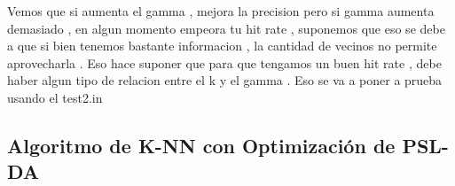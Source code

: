 Vemos que si aumenta el gamma , mejora la precision pero si gamma aumenta demasiado , en algun momento empeora tu hit rate , suponemos que eso se debe a que si bien tenemos bastante informacion , la cantidad de vecinos no permite aprovecharla . Eso hace suponer que para que tengamos un buen hit rate , debe haber algun tipo de relacion entre el k y el gamma . Eso se va a poner a prueba usando el test2.in

\subsection {Algoritmo de K-NN con Optimización de PSL-DA}



